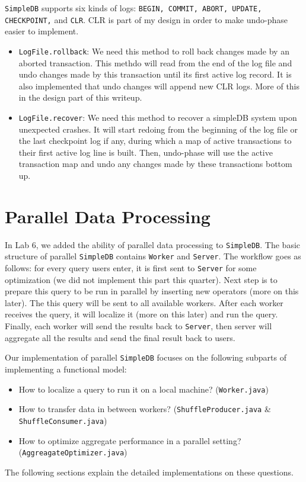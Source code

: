 \documentclass[12pt]{myland}
\def\<#1>{\texttt{#1}}
\begin{document}
    \<SimpleDB> supports six kinds of logs: \<BEGIN, COMMIT, ABORT, UPDATE, CHECKPOINT,> and \<CLR>. CLR is part of my
    design in order to make undo-phase easier to implement.

    \begin{itemize}
        \item \texttt{LogFile.rollback}: We need this method to roll back changes made by an aborted transaction. This
        methdo will read from the end of the log file and undo changes made by this transaction until its first active
        log record. It is also implemented that undo changes will append new CLR logs. More of this in the design part
        of this writeup.

        \item \texttt{LogFile.recover}: We need this method to recover a simpleDB system upon unexpected crashes. It
        will start redoing from the beginning of the log file or the last checkpoint log if any, during which a map of
        active transactions to their first active log line is built. Then, undo-phase will use the active transaction
        map and undo any changes made by these transactions bottom up.
	\end{itemize}

\section{Parallel Data Processing}
	\label{parallel}

    In Lab 6, we added the ability of parallel data processing to \<SimpleDB>. The basic structure of parallel \<SimpleDB>
    contains \<Worker> and \<Server>. The workflow goes as follows: for every query users enter, it is first sent to
    \<Server> for some optimization (we did not implement this part this quarter). Next step is to prepare this query to
    be run in parallel by inserting new operators (more on this later). The this query will be sent to all
    available workers. After each worker receives the query, it will localize it (more on this later) and run the query.
    Finally, each worker will send the results back to \<Server>, then server will aggregate all the results and send
    the final result back to users. \par

    Our implementation of parallel \<SimpleDB> focuses on the following subparts of implementing a functional model:
    \begin{itemize}
        \item How to localize a query to run it on a local machine? (\<Worker.java>)
        \item How to transfer data in between workers? (\<ShuffleProducer.java> \& \<ShuffleConsumer.java>)
        \item How to optimize aggregate performance in a parallel setting? (\<AggreagateOptimizer.java>)
    \end{itemize}
    The following sections explain the detailed implementations on these questions.
\end{document}
